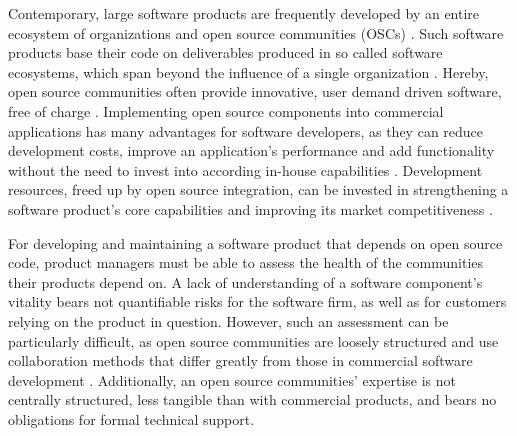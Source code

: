 \documentclass[final,5p,times,twocolumn]{elsarticle}
\begin{document}
Contemporary, large software products are frequently developed by an entire ecosystem of organizations and open source communities (OSCs) \cite{Jansen2009}. Such software products base their code on deliverables produced in so called software ecosystems, which span beyond the influence of a single organization \cite{Bosch2009}. Hereby, open source communities often provide innovative, user demand driven software, free of charge \cite{von2001learning}. Implementing open source components into commercial applications has many advantages for software developers, as they can reduce development costs, improve an application’s performance and add functionality without the need to invest into according in-house capabilities \cite{Bessen2001}. Development resources, freed up by open source integration, can be invested in strengthening a software product’s core capabilities and improving its market competitiveness \cite{Hawkins2004}.

For developing and maintaining a software product that depends on open source code, product managers must be able to assess the health of the communities their products depend on. A lack of understanding of a software component's vitality bears not quantifiable risks for the software firm, as well as for customers relying on the product in question. However, such an assessment can be particularly difficult, as open source communities are loosely structured and use collaboration methods that differ greatly from those in commercial software development \cite{Crowston2005}. Additionally, an open source communities’ expertise is not centrally structured, less tangible than with commercial products, and bears no obligations for formal technical support.
\end{document}
